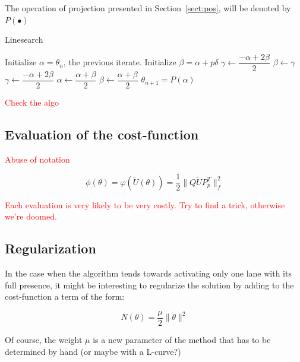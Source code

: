 \documentclass[11pt,a4paper]{article}		%
\begin{document}
The operation of projection presented in Section~\ref{sect:pos}, will be denoted by $P(\bullet)$

\begin{algorithm}[ht]
	\caption{Linesearch}
	\label{alg:linesearch}
	\begin{algorithmic}
		\STATE Initialize $\alpha = \theta_n$, the previous iterate.
		\STATE Initialize $\beta = \alpha + p\delta$
		\STATE $\gamma\leftarrow \dfrac{-\alpha+2\beta}{2}$
		\STATE $\beta\leftarrow\gamma$
		\STATE $\gamma\leftarrow \dfrac{-\alpha+2\beta}{2}$
		\ENDWHILE
		\ENDIF
		\STATE {}
		\STATE $\alpha\leftarrow \dfrac{\alpha+\beta}{2}$
		\ELSE
		\STATE $\beta\leftarrow \dfrac{\alpha+\beta}{2}$
		\ENDIF
		\ENDFOR
		\STATE $\theta_{n+1} = P(\alpha)$
	\end{algorithmic}
\end{algorithm}

\textcolor{red}{Check the algo}

\subsection{Evaluation of the cost-function}

\textcolor{red}{Abuse of notation}

\begin{equation}
\phi(\theta) = \varphi(\tilde{U}(\theta)) = \dfrac{1}{2} \|Q\tilde{U}P_p^T\|_f^2
\end{equation}

\textcolor{red}{Each evaluation is very likely to be very costly. Try to find a trick, otherwise we're doomed.}

\subsection{Regularization}

In the case when the algorithm tends towards activating only one lane with its full presence, it might be interesting to regularize the solution by adding to the cost-function a term of the form:

\begin{equation}
N(\theta) = \dfrac{\mu}{2} \|\theta\|^2
\end{equation}

Of course, the weight $\mu$ is a new parameter of the method that has to be determined by hand (or maybe with a L-curve?)
\end{document}
